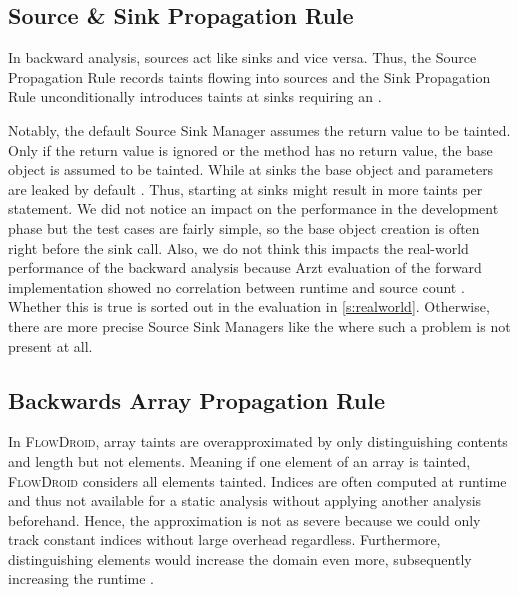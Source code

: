 \documentclass[../draft.tex]{subfiles}
\begin{document}
    \subsection{Source \& Sink Propagation Rule}\label{s:sourcerule}
    In backward analysis, sources act like sinks and vice versa.
    Thus, the Source Propagation Rule records taints flowing into sources and the Sink Propagation Rule unconditionally introduces taints at sinks requiring an .

    Notably, the default Source Sink Manager assumes the return value to be tainted.
    Only if the return value is ignored or the method has no return value, the base object is assumed to be tainted.
    While at sinks the base object and parameters are leaked by default \cite{Arzt2017PhD}.
    Thus, starting at sinks might result in more taints per statement.
    We did not notice an impact on the performance in the development phase but the test cases are fairly simple, so the base object creation is often right before the sink call.
    Also, we do not think this impacts the real-world performance of the backward analysis because Arzt evaluation of the forward implementation showed no correlation between runtime and source count \cite{Arzt2017PhD}.
    Whether this is true is sorted out in the evaluation in \autoref{s:realworld}.
    Otherwise, there are more precise Source Sink Managers like the  where such a problem is not present at all.

    \subsection{Backwards Array Propagation Rule}
    In \textsc{FlowDroid}, array taints are overapproximated by only distinguishing contents and length but not elements. Meaning if one element of an array is tainted, \textsc{FlowDroid} considers all elements tainted.
    Indices are often computed at runtime and thus not available for a static analysis without applying another analysis beforehand. Hence, the approximation is not as severe because we could only track constant indices without large overhead regardless.
    Furthermore, distinguishing elements would increase the domain even more, subsequently increasing the runtime \cite{Arzt2017PhD}.
\end{document}
